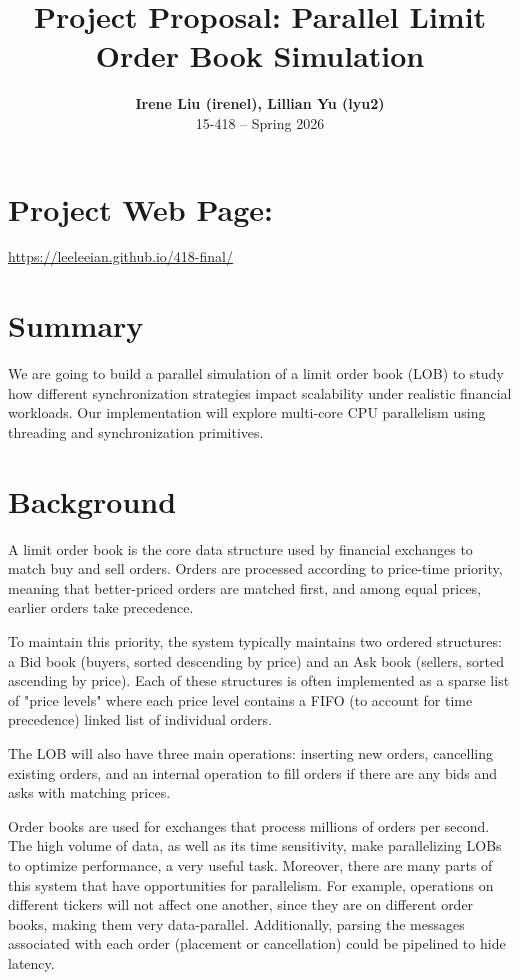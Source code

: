 \documentclass[11pt]{article}
\title{\textbf{Project Proposal: Parallel Limit Order Book Simulation}}
\author{\textbf{Irene Liu (irenel), Lillian Yu (lyu2)} \\ 15-418 – Spring 2026}
\date{}
\begin{document}
\maketitle

\section*{Project Web Page:} 
\url{https://leeleeian.github.io/418-final/}

\section*{Summary}
We are going to build a parallel simulation of a limit order book (LOB) to study how different synchronization strategies impact scalability under realistic financial workloads. Our implementation will explore multi-core CPU parallelism using threading and synchronization primitives.

\section*{Background}
A limit order book is the core data structure used by financial exchanges to match buy and sell orders. Orders are processed according to price-time priority, meaning that better-priced orders are matched first, and among equal prices, earlier orders take precedence.

To maintain this priority, the system typically maintains two ordered structures: a Bid book (buyers, sorted descending by price) and an Ask book (sellers, sorted ascending by price). Each of these structures is often implemented as a sparse list of "price levels" where each price level contains a FIFO (to account for time precedence) linked list of individual orders.

The LOB will also have three main operations: inserting new orders, cancelling existing orders, and an internal operation to fill orders if there are any bids and asks with matching prices.  

Order books are used for exchanges that process millions of orders per second. The high volume of data, as well as its time sensitivity, make parallelizing LOBs to optimize performance, a very useful task. Moreover, there are many parts of this system that have opportunities for parallelism. For example, operations on different tickers will not affect one another, since they are on different order books, making them very data-parallel. Additionally, parsing the messages associated with each order (placement or cancellation) could be pipelined to hide latency. 
\end{document}
